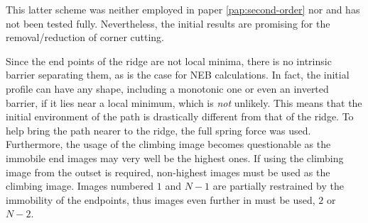 This latter scheme was neither employed in paper \ref{pap:second-order} nor  and has not been tested fully.
Nevertheless, the initial results are promising for the removal/reduction of corner cutting.

Since the end points of the ridge are not local minima, there is no intrinsic barrier separating them, as is the case for NEB calculations.
In fact, the initial profile can have any shape, including a monotonic one or even an inverted barrier, if it lies near a local minimum, which is \emph{not} unlikely.
This means that the initial environment of the path is drastically different from that of the ridge.
To help bring the path nearer to the ridge, the full spring force was used.
Furthermore, the usage of the climbing image becomes questionable as the immobile end images may very well be the highest ones.
If using the climbing image from the outset is required, non-highest images must be used as the climbing image.
Images numbered $1$ and $N-1$ are partially restrained by the immobility of the endpoints, thus images even further in must be used, $2$ or $N-2$.

